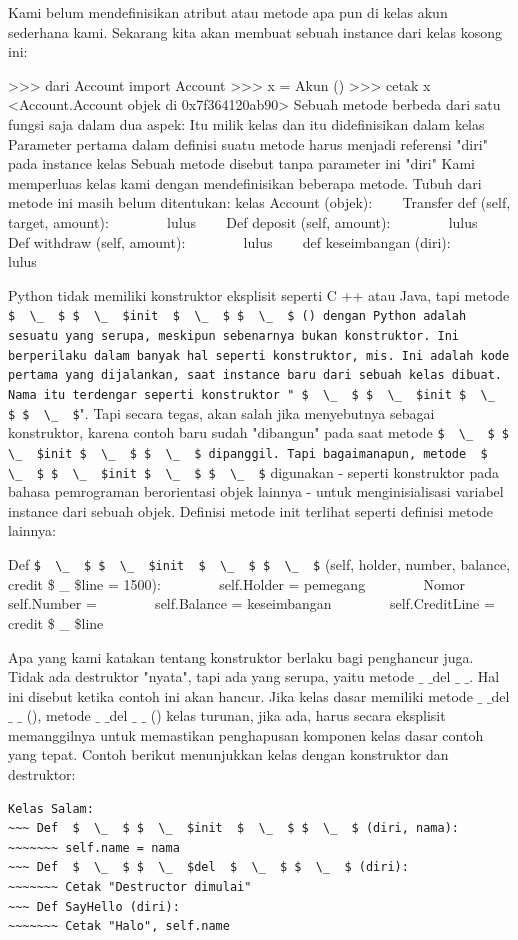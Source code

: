 Kami belum mendefinisikan atribut atau metode apa pun di kelas akun sederhana kami. Sekarang kita akan membuat sebuah instance dari kelas kosong ini:

>>> dari Account import Account
>>> x = Akun ()
>>> cetak x
<Account.Account objek di 0x7f364120ab90>
Sebuah metode berbeda dari satu fungsi saja dalam dua aspek:
Itu milik kelas dan itu didefinisikan dalam kelas
Parameter pertama dalam definisi suatu metode harus menjadi referensi "diri" pada instance kelas
Sebuah metode disebut tanpa parameter ini "diri"
Kami memperluas kelas kami dengan mendefinisikan beberapa metode. Tubuh dari metode ini masih belum ditentukan:
kelas Account (objek):
~~~ Transfer def (self, target, amount):
~~~~~~~ lulus
~~~ Def deposit (self, amount):
~~~~~~~ lulus
~~~ Def withdraw (self, amount):
~~~~~~~ lulus
~~~ def keseimbangan (diri):
~~~~~~~ lulus

Python tidak memiliki konstruktor eksplisit seperti C ++ atau Java, tapi metode \verb| $  \_  $ $  \_  $init  $  \_  $ $  \_  $ () dengan Python adalah sesuatu yang serupa, meskipun sebenarnya bukan konstruktor. Ini berperilaku dalam banyak hal seperti konstruktor, mis. Ini adalah kode pertama yang dijalankan, saat instance baru dari sebuah kelas dibuat. Nama itu terdengar seperti konstruktor " $  \_  $ $  \_  $init $  \_  $ $  \_  $|". Tapi secara tegas, akan salah jika menyebutnya sebagai konstruktor, karena contoh baru sudah "dibangun" pada saat metode  \verb|$  \_  $ $  \_  $init $  \_  $ $  \_  $ dipanggil. Tapi bagaimanapun, metode  $  \_  $ $  \_  $init $  \_  $ $  \_  $| digunakan - seperti konstruktor pada bahasa pemrograman berorientasi objek lainnya - untuk menginisialisasi variabel instance dari sebuah objek. Definisi metode init terlihat seperti definisi metode lainnya:

Def  \verb|$  \_  $ $  \_  $init  $  \_  $ $  \_  $| (self, holder, number, balance, credit \$  \_  \$line = 1500): 
~~~~~~~ self.Holder = pemegang
~~~~~~~ Nomor self.Number =
~~~~~~~ self.Balance = keseimbangan
~~~~~~~ self.CreditLine = credit \$  \_  \$line

Apa yang kami katakan tentang konstruktor berlaku bagi penghancur juga. Tidak ada destruktor "nyata", tapi ada yang serupa, yaitu metode  $  \_  $ $  \_  $del $  \_  $ $  \_  $. Hal ini disebut ketika contoh ini akan hancur. Jika kelas dasar memiliki metode  $  \_  $ $  \_  $del  $  \_  $ $  \_  $ (), metode  $  \_  $ $  \_  $del  $  \_  $ $  \_  $ () kelas turunan, jika ada, harus secara eksplisit memanggilnya untuk memastikan penghapusan komponen kelas dasar contoh yang tepat.
Contoh berikut menunjukkan kelas dengan konstruktor dan destruktor:

\begin{verbatim}
Kelas Salam:
~~~ Def  $  \_  $ $  \_  $init  $  \_  $ $  \_  $ (diri, nama):
~~~~~~~ self.name = nama
~~~ Def  $  \_  $ $  \_  $del  $  \_  $ $  \_  $ (diri):
~~~~~~~ Cetak "Destructor dimulai"
~~~ Def SayHello (diri):
~~~~~~~ Cetak "Halo", self.name
\end{verbatim}
